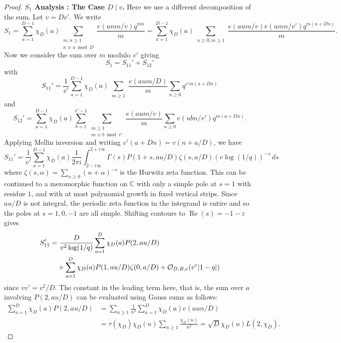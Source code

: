 \documentclass[11pt]{amsart}
\numberwithin{equation}{section}
\newcommand{\mb}{\mathbb}
\newcommand{\mf}{\mathfrak}
\newcommand{\n}{\mf{n}_D}
\newcommand{\m}{\mathrm{m}}
\theoremstyle{remark}
\begin{document}
\begin{proof}

\noindent \textbf{$S_1$ Analysis : The Case $D \mid v$.} Here we use a different decomposition of the sum. Let $v=Dv'$. We write
\[
S_1
=
\sum_{a=1}^{D-1}\chi_D(a)\sum_{\substack{m,n\geq 1\\n\equiv a \bmod D}}\frac{e(umn/v)q^{mn}}{m}
=
\sum_{a=1}^{D-1}\chi_D(a)\sum_{\substack{n\geq 0,m\geq 1}}\frac{e(aum/v)e(umn/v')q^{m(a+Dn)}}{m}.
\]
Now we consider the sum over $m$ modulo $v'$ giving 
\[
S_1=S_{11}'+S_{12}'
\]
with 
\[
S_{11}'
=
\frac{1}{v'}\sum_{a=1}^{D-1}\chi_D(a)\sum_{\substack{m\geq 1}}\frac{e(aum/D)}{m}\sum_{n\geq 0}q^{v'm(a+Dn)}
\]
and
\[
S_{12}'
=
\sum_{a=1}^{D-1}\chi_D(a)\sum_{b=1}^{v'-1}\sum_{\substack{m\geq 1\\m\equiv b \bmod v'}}\frac{e(aum/v)}{m}\sum_{n\geq 0}e(ubn/v')q^{m(a+Dn)}.
\]
Applying Mellin inversion and writing $v'(a+Dn)=v(n+a/D)$, we have 
\[
S_{11}'
=
\frac{1}{v'}\sum_{a=1}^{D-1}\chi_D(a)
\frac{1}{2\pi i }\int_{2-i\infty}^{2+i\infty}
\Gamma(s)P(1+s, au/D)\zeta(s,a/D)(v\log(1/q))^{-s}\, ds
\]
where $\zeta(s,\alpha)=\sum_{n\geq 0}(n+\alpha)^{-s}$ is the Hurwitz zeta function. This can be continued to a meromorphic function on $\mb{C}$ with only a simple pole at $s=1$ with residue $1$, and with at most polynomial growth in fixed vertical strips. Since $au/D$ is not integral, the periodic zeta function in the integrand is entire and so the poles at $s=1,0,-1$ are all simple. Shifting contours to $\operatorname{Re}(s)=-1-\varepsilon$ gives
\begin{align} \label{S11' Contribution}
S_{11}'
&=
\frac{D}{v^2\log(1/q)}\sum_{a=1}^D\chi_D(a)P(2,au/D) \notag \\
&\quad +
\sum_{a=1}^D\chi_D(a)P(1,au/D)\zeta(0,a/D)
+\mathcal{O}_{D,B, \varepsilon}(v^{\varepsilon}|1-q|)
\end{align} 
since $vv'=v^2/D$.
The constant in the leading term here, that is, the sum over $a$ involving $P(2,au/D)$ can be evaluated using Gauss sums as follows: 
\begin{align*}
\sum_{a=1}^D\chi_D(a)P(2,au/D) &=\sum_{n\geq 1}\frac{1}{n^2}\sum_{a=1}^D\chi_D(a)e(aun/D)\\
&=
\tau(\chi_D)\chi_D(u)\sum_{n\geq 1}\frac{\chi_D(n)}{n^2}
=
\sqrt{D}\chi_D(u)L(2,\chi_D).
\end{align*}




\end{proof}
\end{document}
